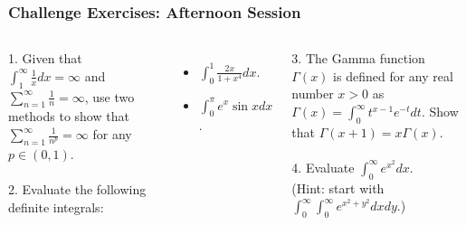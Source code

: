 \documentclass{beamer}
\begin{document}
\begin{frame}
\frametitle{Challenge Exercises: Afternoon Session}
\begin{columns}[t] %

1. Given that $\int_1^{\infty} \frac{1}{x} dx = \infty$ and $\sum_{n=1}^{\infty} \frac{1}{n} = \infty$, use two methods to show that $\sum_{n=1}^{\infty} \frac{1}{n^p} = \infty$ for any $p \in (0,1)$.
\\~\\
2. Evaluate the following definite integrals:
\begin{itemize}
\item $\int_0^1 \frac{2x}{1+x^4} dx$.
\item $\int_0^{\pi} e^x\sin xdx$.
\end{itemize}
3. The Gamma function $\Gamma (x)$ is defined for any real number $x > 0$ as $\Gamma (x) = \int_{0}^{\infty} t^{x-1}e^{-t}dt$. Show that $\Gamma (x+1) = x\Gamma (x)$.
\\~\\
4. Evaluate $\int_{0}^{\infty} e^{x^2} dx$.\\
(Hint: start with $\int_{0}^{\infty}\int_{0}^{\infty} e^{x^2+y^2} dxdy$.)
\end{columns}

\end{frame}




\end{document}
